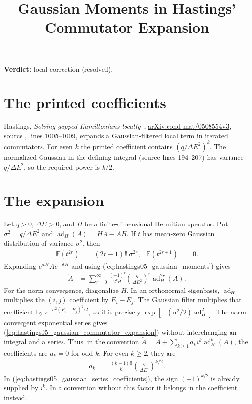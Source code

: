 \documentclass{article}
\title{Gaussian Moments in Hastings' Commutator Expansion}
\author{}
\date{}
\providecommand{\gapnote}[2]{\par\noindent\textbf{Verdict:} #1 (#2).\par}
\begin{document}
\maketitle
\gapnote{local-correction}{resolved}

\section{The printed coefficients}
Hastings, \emph{Solving gapped Hamiltonians locally}~\cite{Hastings2006Solving},
\href{https://arxiv.org/abs/cond-mat/0508554v3}{arXiv:cond-mat/0508554v3},
source , lines 1005--1009, expands a Gaussian-filtered
local term in iterated commutators. For even $k$ the printed coefficient
contains $(q/\Delta E^2)^k$. The normalized Gaussian in the defining
integral (source lines 194--207) has variance $q/\Delta E^2$, so the required
power is $k/2$.

\section{The expansion}
Let $q>0$, $\Delta E>0$, and $H$ be a finite-dimensional Hermitian operator.
Put $\sigma^2=q/\Delta E^2$ and $\operatorname{ad}_H(A)=HA-AH$. If $t$ has
mean-zero Gaussian distribution of variance $\sigma^2$, then
\begin{align}
 \mathbb E(t^{2r})&=(2r-1)!!\,\sigma^{2r}, &
 \mathbb E(t^{2r+1})&=0.
 \label{eq:hastings05_gaussian_moments}
\end{align}
Expanding $e^{itH}Ae^{-itH}$ and using
(\ref{eq:hastings05_gaussian_moments}) gives
\begin{align}
 \widetilde A
 &=\sum_{r=0}^{\infty}\frac{(-1)^r}{2^r r!}
       \left(\frac q{\Delta E^2}\right)^r
       \operatorname{ad}_H^{2r}(A).
 \label{eq:hastings05_gaussian_commutator_expansion}
\end{align}
For the norm convergence, diagonalize $H$. In an orthonormal eigenbasis,
$\operatorname{ad}_H$ multiplies the $(i,j)$ coefficient by $E_i-E_j$.
The Gaussian filter multiplies that coefficient by
$e^{-\sigma^2(E_i-E_j)^2/2}$, so it is precisely
$\exp[-(\sigma^2/2)\operatorname{ad}_H^2]$. The norm-convergent
exponential series gives (\ref{eq:hastings05_gaussian_commutator_expansion})
without interchanging an integral and a series. Thus, in the convention
$\widetilde A=A+\sum_{k\ge1}a_k i^k\operatorname{ad}_H^k(A)$, the coefficients
are $a_k=0$ for odd $k$. For even $k\ge2$, they are
\begin{align}
 a_k&=\frac{(k-1)!!}{k!}\left(\frac q{\Delta E^2}\right)^{k/2}.
 \label{eq:hastings05_gaussian_series_coefficients}
\end{align}
In (\ref{eq:hastings05_gaussian_series_coefficients}), the sign
$(-1)^{k/2}$ is already supplied by $i^k$. In a convention without
this factor it belongs in the coefficient instead.
\end{document}
